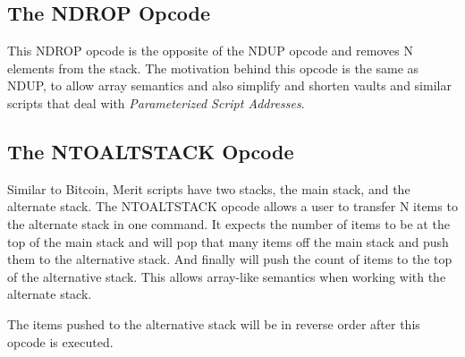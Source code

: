 \documentclass{article}
\begin{document}
\subsection{The NDROP Opcode}

\begin{center}
\end{center}

This NDROP opcode is the opposite of the NDUP opcode and removes N elements from the stack.
The motivation behind this opcode is the same as NDUP, to allow array semantics and
also simplify and shorten vaults and similar scripts that deal with
\emph{Parameterized Script Addresses}.

\subsection{The NTOALTSTACK Opcode}

\begin{center}
\end{center}

Similar to Bitcoin, Merit scripts have two stacks, the main stack, and the alternate
stack. The NTOALTSTACK opcode allows a user to transfer N items to the alternate stack
in one command. It expects the number of items to be at the top of the main stack and
will pop that many items off the main stack and push them to the alternative stack. And
finally will push the count of items to the top of the alternative stack. This allows 
array-like semantics when working with the alternate stack.

The items pushed to the alternative stack will be in reverse order after this opcode is
executed.
\end{document}

